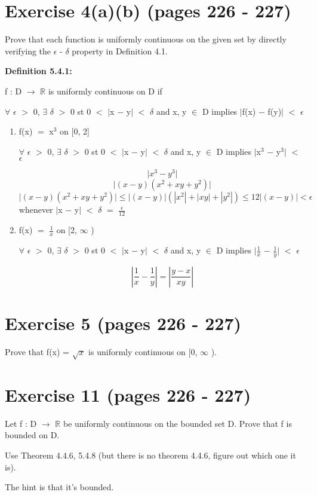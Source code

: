 \documentclass{article}
\newcommand{\mt}[1]{\ensuremath{#1}}
\newcommand\bsc[2][\DefaultOpt]{%
  \def\DefaultOpt{#2}%
  \section[#1]{#2}%
}
\newcommand{\balist}{\begin{enumerate}[label=\alph*.]}
\newcommand{\elist}{\end{enumerate}}
\newcommand{\br}{\mt{\mathbb{R}} }       %
\newcommand{\ep}{\mt{\epsilon} }         %
\newcommand{\fa}{\mt{\forall} }          %
\newcommand{\dta}{\mt{\delta} }
\newcommand{\mem}{\mt{\in} }
\newcommand{\exs}{\mt{\exists} }
\newcommand{\lra}{ \mt{\longrightarrow} } %
\newcommand{\av}[1]{\mt{|}#1\mt{|}}  %
\newcommand{\ms}{\mt{-} }
\newcommand{\ls}{\mt{<} }
\newcommand{\gr}{\mt{>} }
\newcommand{\lse}{\mt{\leq} }
\newcommand{\eql}{\mt{=} }
\newcommand{\uf}[2]{#1\mt{^{#2}}}
\newcommand{\frc}[2]{\mt{\frac{#1}{#2}}}
\newcommand{\eqn}[1]{\[#1\]}
\newcommand{\infy}{\mt{\infty} }
\begin{document}
\bsc{Exercise 4(a)(b) (pages 226 - 227)}{
Prove that each function is uniformly continuous on the given set by directly verifying the \ep - \dta property in Definition 4.1.

\textbf{Definition 5.4.1:}

f : D \lra \br is uniformly continuous on D if

\fa \ep \gr 0, \exs \dta \gr 0 st 0 \ls \av{x \ms y} \ls \dta and x, y \mem D implies \av{f(x) \ms f(y)} \ls \ep

\balist
\item f(x) \eql \uf{x}{3} on [0, 2]

\fa \ep \gr 0, \exs \dta \gr 0 st 0 \ls \av{x \ms y} \ls \dta and x, y \mem D implies \av{\uf{x}{3} \ms \uf{y}{3}} \ls \ep

\eqn{\av{\uf{x}{3} \ms \uf{y}{3}}}
\eqn{\av{(x - y)(x^2 + xy + y^2)}}
\eqn{\av{(x - y)(x^2 + xy + y^2)} \lse |(x - y)|(|x^2| + |xy| + |y^2|) \lse 12|(x - y)| \ls \ep}
whenever \av{x \ms y} \ls \dta \eql \frc{\ep}{12}

\item f(x) \eql \frc{1}{x} on [2, \infy)

\fa \ep \gr 0, \exs \dta \gr 0 st 0 \ls \av{x \ms y} \ls \dta and x, y \mem D implies \av{\frc{1}{x} \ms \frc{1}{y}} \ls \ep

\eqn{|\frac{1}{x} - \frac{1}{y}| = |\frac{y - x}{xy}|}
\elist

}
\bsc{Exercise 5 (pages 226 - 227)}{

Prove that f(x) = $\sqrt{x}$ is uniformly continuous on [0, \infy). 

}
\bsc{Exercise 11 (pages 226 - 227)}{

Let f : D \lra \br be uniformly continuous on the bounded set D. Prove that f is bounded on D. 

Use Theorem 4.4.6, 5.4.8 (but there is no theorem 4.4.6, figure out which one it is).

The hint is that it's bounded.
}
\end{document}
